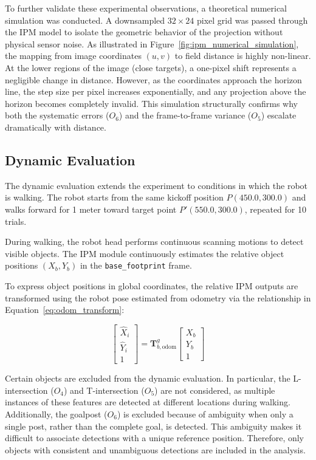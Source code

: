 \documentclass[journal]{IAENGtran}
\begin{document}
To further validate these experimental observations, a theoretical numerical 
simulation was conducted. A downsampled $32 \times 24$ pixel grid was passed 
through the IPM model to isolate the geometric behavior of the projection without 
physical sensor noise. As illustrated in Figure~\ref{fig:ipm_numerical_simulation},
the mapping from image coordinates $(u, v)$ to field distance is highly non-linear. 
At the lower regions of the image (close targets), a one-pixel shift represents a 
negligible change in distance. However, as the coordinates approach the horizon line, 
the step size per pixel increases exponentially, and any projection above the horizon 
becomes completely invalid. This simulation structurally confirms why both the systematic 
errors ($O_6$) and the frame-to-frame variance ($O_5$) escalate dramatically with distance.



\subsection{Dynamic Evaluation}

The dynamic evaluation extends the experiment to conditions in
which the robot is walking. The robot starts from the same kickoff
position $P(450.0, 300.0)$ and walks forward for 1 meter toward target point
$P'(550.0, 300.0)$, repeated for 10 trials.

During walking, the robot head performs continuous scanning motions
to detect visible objects. The IPM module continuously estimates
the relative object positions $(X_b, Y_b)$ in the
\texttt{base\_footprint} frame.

To express object positions in global coordinates, the relative
IPM outputs are transformed using the robot pose estimated from odometry
via the relationship in Equation~\ref{eq:odom_transform}:

\begin{equation} \label{eq:odom_transform}
\begin{bmatrix}
\hat{X}_i \\
\hat{Y}_i \\
1
\end{bmatrix}
=
\mathbf{T}_{b,\text{odom}}^{g}
\begin{bmatrix}
X_b \\
Y_b \\
1
\end{bmatrix}
\end{equation}

Certain objects are excluded from the dynamic evaluation. In particular,
the L-intersection ($O_4$) and T-intersection ($O_5$) are not considered,
as multiple instances of these features are detected at different
locations during walking. Additionally, the goalpost ($O_6$) is excluded because of
ambiguity when only a single post, rather than the complete goal, is detected.
This ambiguity makes it difficult to associate detections with a unique reference position.
Therefore, only objects with consistent and unambiguous detections are included in the analysis.
\end{document}
